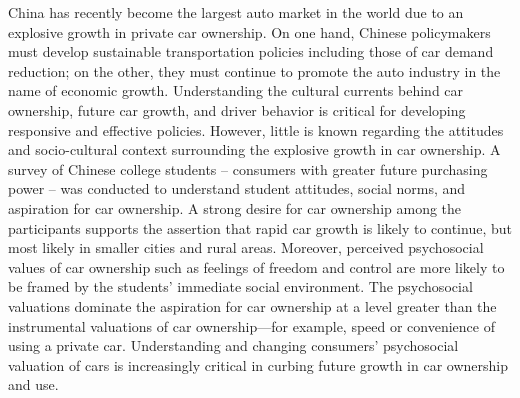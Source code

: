 China has recently become the largest auto market in the world due to an explosive growth in private car ownership. On one hand, Chinese policymakers must develop sustainable transportation policies including those of car demand reduction; on the other, they must continue to promote the auto industry in the name of economic growth. Understanding the cultural currents behind car ownership, future car growth, and driver behavior is critical for developing responsive and effective policies. However, little is known regarding the attitudes and socio-cultural context surrounding the explosive growth in car ownership. A survey of Chinese college students – consumers with greater future purchasing power – was conducted to understand student attitudes, social norms, and aspiration for car ownership. A strong desire for car ownership among the participants supports the assertion that rapid car growth is likely to continue, but most likely in smaller cities and rural areas. Moreover, perceived psychosocial values of car ownership such as feelings of freedom and control are more likely to be framed by the students’ immediate social environment. The psychosocial valuations dominate the aspiration for car ownership at a level greater than the instrumental valuations of car ownership—for example, speed or convenience of using a private car. Understanding and changing consumers’ psychosocial valuation of cars is increasingly critical in curbing future growth in car ownership and use.
